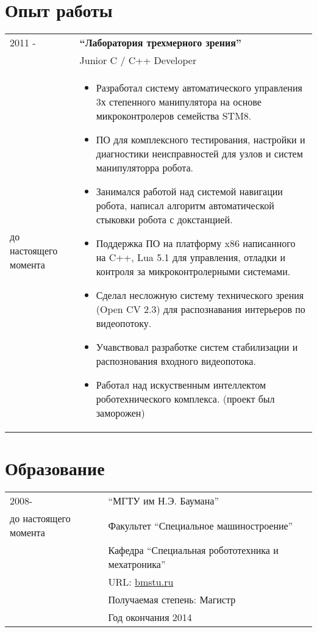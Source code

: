 \documentclass[a4paper, 11pt]{article}
\begin{document}
\section{Опыт работы }
\begin{tabular}{p{25mm}|p{110mm}}
2011 -& \textbf{``Лаборатория трехмерного зрения''} \\
& Junior C / C++ Developer \\
до настоящего момента &
\begin{itemize}
    \item Разработал систему автоматического управления 
    3х степенного манипулятора на основе микроконтролеров семейства STM8.
    \item ПО для комплексного тестирования, настройки и диагностики
    неисправностей для узлов и систем манипуляторра робота.
    \item Занимался работой над системой навигации робота,
    написал алгоритм автоматической стыковки робота с докстанцией.
    \item Поддержка ПО на платформу x86 написанного на C++, Lua 5.1 
    для управления, отладки и контроля за микроконтролерными системами.
    \item Сделал несложную систему технического зрения (Open CV 2.3) 
    для распознавания интерьеров по видеопотоку.
    \item Учавствовал разработке систем стабилизации и
    распознования входного видеопотока.
    \item Работал над искуственным интеллектом роботехнического комплекса.
    (проект был заморожен) 
\end{itemize}
\\
\end{tabular}

\section{Образование}
\begin{tabular}{p{25mm}|p{110mm}}
2008-                 & ``МГТУ им Н.Э. Баумана'' \\ 
до настоящего момента & Факультет ``Специальное машиностроение'' \\
                      & Кафедра ``Специальная робототехника и мехатроника'' \\
                      & URL: \href{http://bmstu.ru}{bmstu.ru} \\
                      & Получаемая степень: Магистр \\
                      & Год окончания 2014
\end{tabular}
\end{document}
